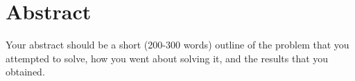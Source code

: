 \section*{Abstract}

Your abstract should be a short (200-300 words) outline of the problem that you attempted to solve, how you went about solving it, and the results that you obtained.
